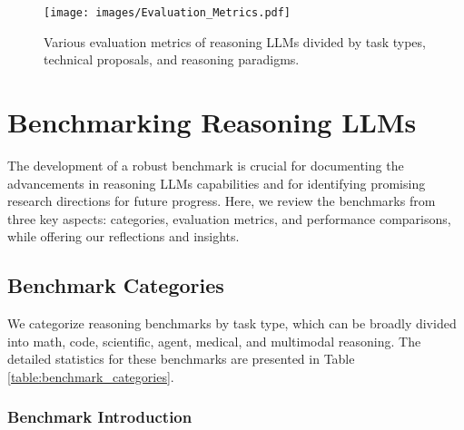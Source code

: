 
\begin{figure*}[t]
    \centering
    \texttt{[image: images/Evaluation\_Metrics.pdf]}
    \caption{Various evaluation metrics of reasoning LLMs divided by task types, technical proposals, and reasoning paradigms.}
    \label{fig:evaluation_metrics}
\end{figure*}

\section{Benchmarking Reasoning LLMs}\label{benchmark}

The development of a robust benchmark is crucial for documenting the advancements in reasoning LLMs capabilities and for identifying promising research directions for future progress. 
Here, we review the benchmarks from three key aspects: categories, evaluation metrics, and performance comparisons, while offering our reflections and insights.

\subsection{Benchmark Categories}\label{benchmark_category}


We categorize reasoning benchmarks by task type, which can be broadly divided into math, code, scientific, agent, medical, and multimodal reasoning. The detailed statistics for these benchmarks are presented in Table \ref{table:benchmark_categories}.

\subsubsection{Benchmark Introduction} 

